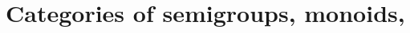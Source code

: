 
\section[Categories of structures]{Categories of semigroups, monoids, \etc}
\label{sec:cats-of-semigroups-monoids-etc}




